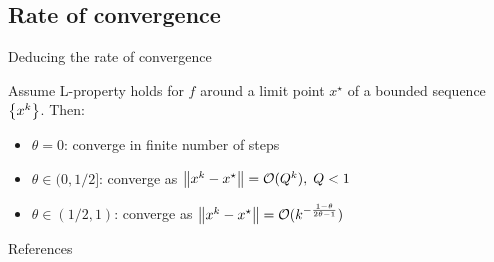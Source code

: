 \documentclass[usenames, dvipsnames, 10pt]{beamer}
\theoremstyle{definition}
\begin{document}
\subsection{Rate of convergence}

\begin{frame}{Deducing the rate of convergence}
    \begin{block}{\cite[Theorem 2]{AttBol09}}
        Assume L-property holds for $f$ around a limit point $x^{\star}$ of
        a bounded sequence $\left\{ x^k \right\}$. Then:
        \begin{itemize}
        \item $\theta = 0$: converge in finite number of steps
        \item $\theta \in (0, 1/2]$: converge as $\left \| x^k - x^{\star} \right \|
        = \mathcal{O}(Q^k), \; Q < 1$
        \item $\theta \in (1/2, 1)$: converge as
        $\left \| x^k - x^{\star} \right \| = \mathcal{O}(k^{-\frac{1-\theta}{2\theta - 1}})$
        \end{itemize}
    \end{block}
\end{frame}

\begin{frame}[allowframebreaks]{References}

%

\end{frame}
\end{document}
